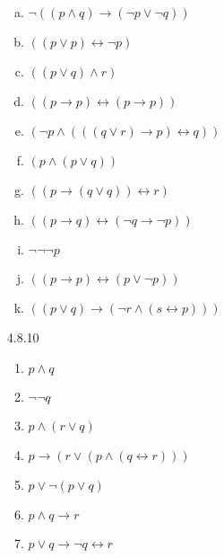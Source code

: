 \begin{enumerate}
\begin{enumerate}[(a)]
\item $\neg((p\land q)\to (\neg p\lor\neg q))$

\item $((p\lor p)\leftrightarrow \neg p)$

\item $((p\lor q)\land r)$

\item $((p\to p)\leftrightarrow (p\to p))$

\item $(\neg p \land (((q\lor r)\to p)\leftrightarrow q))$



\item $(p\land (p\lor q))$



\item $((p\to (q\lor q))\leftrightarrow r)$



\item $((p\to q)\leftrightarrow (\neg q\to \neg p))$



\item $\neg\neg\neg p$



\item $(({p} \to {p}) \leftrightarrow ({p}\lor \neg {p}))$


\item $((p\lor q)\to (\neg r\land (s\leftrightarrow {p})))$

		
		\end{enumerate}
		
		\item[4.8.10] \
		
		\begin{enumerate}
		
			\item $p\land q$
		
			\item $\neg\neg q$
			
			\item $p\land (r\lor q)$
			
			\item $p\to (r\lor (p\land (q\leftrightarrow r)))$
			
			\item $p\lor \neg (p\lor q)$
			
			\item $p\land q\to r$
			
			\item $p\lor q\to \neg q\leftrightarrow r$
			

\end{enumerate}
\end{enumerate}
